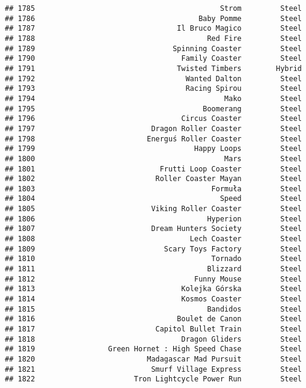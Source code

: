 \documentclass[
]{article}
\begin{document}
\begin{verbatim}
## 1785                                           Strom         Steel
## 1786                                      Baby Pomme         Steel
## 1787                                 Il Bruco Magico         Steel
## 1788                                        Red Fire         Steel
## 1789                                Spinning Coaster         Steel
## 1790                                  Family Coaster         Steel
## 1791                                 Twisted Timbers        Hybrid
## 1792                                   Wanted Dalton         Steel
## 1793                                   Racing Spirou         Steel
## 1794                                            Mako         Steel
## 1795                                       Boomerang         Steel
## 1796                                  Circus Coaster         Steel
## 1797                           Dragon Roller Coaster         Steel
## 1798                          Energuś Roller Coaster         Steel
## 1799                                     Happy Loops         Steel
## 1800                                            Mars         Steel
## 1801                             Frutti Loop Coaster         Steel
## 1802                            Roller Coaster Mayan         Steel
## 1803                                         Formuła         Steel
## 1804                                           Speed         Steel
## 1805                           Viking Roller Coaster         Steel
## 1806                                        Hyperion         Steel
## 1807                           Dream Hunters Society         Steel
## 1808                                    Lech Coaster         Steel
## 1809                              Scary Toys Factory         Steel
## 1810                                         Tornado         Steel
## 1811                                        Blizzard         Steel
## 1812                                     Funny Mouse         Steel
## 1813                                  Kolejka Górska         Steel
## 1814                                  Kosmos Coaster         Steel
## 1815                                        Bandidos         Steel
## 1816                                 Boulet de Canon         Steel
## 1817                            Capitol Bullet Train         Steel
## 1818                                  Dragon Gliders         Steel
## 1819                 Green Hornet : High Speed Chase         Steel
## 1820                          Madagascar Mad Pursuit         Steel
## 1821                           Smurf Village Express         Steel
## 1822                       Tron Lightcycle Power Run         Steel

\end{verbatim}
\end{document}
